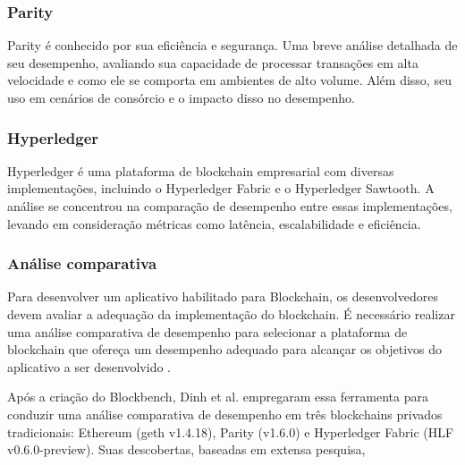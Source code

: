      \subsubsection{ Parity }

     Parity é conhecido por sua eficiência e segurança. Uma breve análise detalhada de seu desempenho, avaliando sua capacidade de processar transações em alta velocidade e como ele se comporta em ambientes de alto volume. Além disso, seu uso em cenários de consórcio e o impacto disso no desempenho.
     
     \subsubsection{Hyperledger}

      Hyperledger é uma plataforma de blockchain empresarial com diversas implementações, incluindo o Hyperledger Fabric e o Hyperledger Sawtooth. A análise se concentrou na comparação de desempenho entre essas implementações, levando em consideração métricas como latência, escalabilidade e eficiência. 
      
     \subsubsection{Análise comparativa}

      Para desenvolver um aplicativo habilitado para Blockchain, os desenvolvedores devem avaliar a adequação da implementação do blockchain. É necessário realizar uma análise comparativa de desempenho para selecionar a plataforma de blockchain que ofereça um desempenho adequado para alcançar os objetivos do aplicativo a ser desenvolvido .

      Após a criação do Blockbench, Dinh et al.\cite{blockbench} empregaram essa ferramenta para conduzir uma análise comparativa de desempenho em três blockchains privados tradicionais: Ethereum (geth v1.4.18), Parity (v1.6.0) e Hyperledger Fabric (HLF v0.6.0-preview). Suas descobertas, baseadas em extensa pesquisa, 

